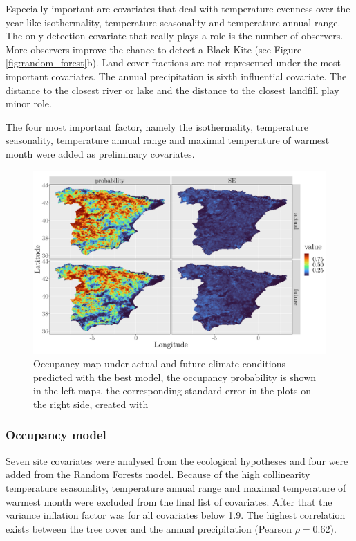 \begin{multicols}{2}
Especially important are covariates that deal with temperature evenness over the year like isothermality, temperature seasonality and temperature annual range. The only detection covariate that really plays a role is the number of observers. More observers improve the chance to detect a Black Kite (see Figure \ref{fig:random_forest}b). Land cover fractions are not represented under the most important covariates. The annual precipitation is sixth influential covariate. The distance to the closest river or lake and the distance to the closest landfill play minor role.

The four most important factor, namely the isothermality, temperature seasonality, temperature annual range and maximal temperature of warmest month were added as preliminary covariates.   

\begin{figure}[t]
	\centering
	\includegraphics[width=\linewidth]{img/best_model_map}
	\caption{Occupancy map under actual and future climate conditions predicted with the best model, the occupancy probability is shown in the left maps, the corresponding standard error in the plots on the right side, created with \textcite{ggplot2}}	
	\label{fig:map}
\end{figure}


\subsubsection*{Occupancy model}
Seven site covariates were analysed from the ecological hypotheses and four were added from the Random Forests model. Because of the high collinearity temperature seasonality, temperature annual range and maximal temperature of warmest month were excluded from the final list of covariates. After that the variance inflation factor was for all covariates below 1.9. The highest correlation exists between the tree cover and the annual precipitation (Pearson $\rho = 0.62$). 


\end{multicols}
